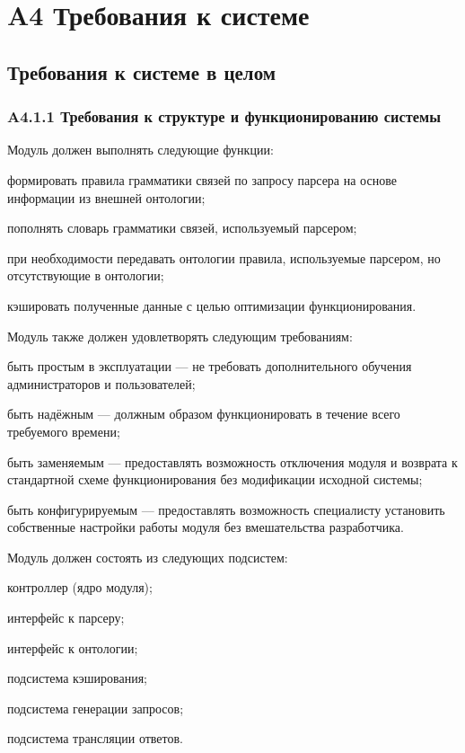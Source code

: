 \section*{A4 Требования к системе}
\subsection*{Требования к системе в целом}
\subsubsection*{A4.1.1 Требования к структуре и функционированию системы}

Модуль должен выполнять следующие функции:
\begin{list}{}{\leftmargin=1.5cm}
  \item формировать правила грамматики связей по запросу парсера на основе информации из внешней онтологии;
  \item пополнять словарь грамматики связей, используемый парсером;
  \item при необходимости передавать онтологии правила, используемые парсером, но отсутствующие в онтологии;
  \item кэшировать полученные данные с целью оптимизации функционирования.
\end{list}

Модуль также должен удовлетворять следующим требованиям:
\begin{list}{}{\leftmargin=1.5cm}
  \item быть простым в эксплуатации --- не требовать дополнительного обучения администраторов и пользователей;
  \item быть надёжным --- должным образом функционировать в течение всего требуемого времени;
  \item быть заменяемым --- предоставлять возможность отключения модуля и возврата к стандартной схеме функционирования без модификации исходной системы;
  \item быть конфигурируемым --- предоставлять возможность специалисту установить собственные настройки работы модуля без вмешательства разработчика.
\end{list}

Модуль должен состоять из следующих подсистем:
\begin{list}{}{\leftmargin=1.5cm}
  \item контроллер (ядро модуля);
  \item интерфейс к парсеру;
  \item интерфейс к онтологии;
  \item подсистема кэширования;
  \item подсистема генерации запросов;
  \item подсистема трансляции ответов.
\end{list}

